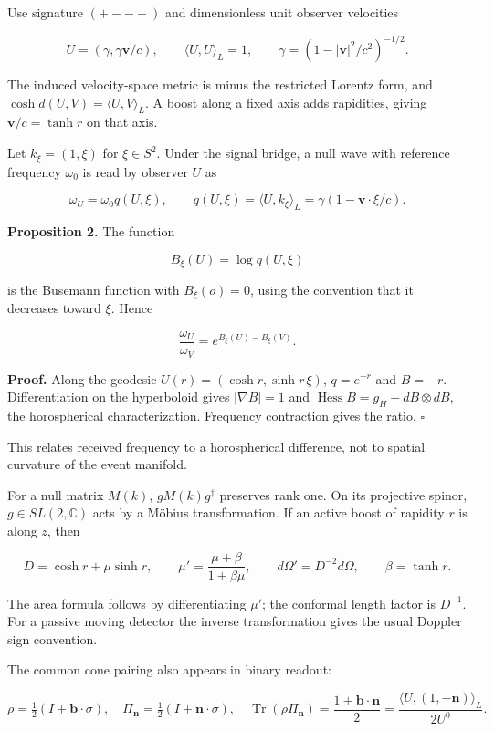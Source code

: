 \documentclass[
  11pt,
  a4paper,
]{article}
\begin{document}
Use signature \((+---)\) and dimensionless unit observer velocities

\[U=(\gamma,\gamma\mathbf v/c),\qquad
\langle U,U\rangle_L=1,\qquad \gamma=(1-|\mathbf v|^2/c^2)^{-1/2}.\]

The induced velocity-space metric is minus the restricted Lorentz form, and \(\cosh d(U,V)=\langle U,V\rangle_L\). A boost along a fixed axis adds rapidities, giving \(\mathbf v/c=\tanh r\) on that axis.

Let \(k_\xi=(1,\xi)\) for \(\xi\in S^2\). Under the signal bridge, a null wave with reference frequency \(\omega_0\) is read by observer \(U\) as

\[\omega_U=\omega_0q(U,\xi),\qquad
q(U,\xi)=\langle U,k_\xi\rangle_L
=\gamma(1-\mathbf v\cdot\xi/c).\]

\textbf{Proposition 2.} The function

\[B_\xi(U)=\log q(U,\xi)\]

is the Busemann function with \(B_\xi(o)=0\), using the convention that it decreases toward \(\xi\). Hence

\[\frac{\omega_U}{\omega_V}
=e^{B_\xi(U)-B_\xi(V)}.\]

\textbf{Proof.} Along the geodesic \(U(r)=(\cosh r,\sinh r\,\xi)\), \(q=e^{-r}\) and \(B=-r\). Differentiation on the hyperboloid gives \(|\nabla B|=1\) and \(\operatorname{Hess}B=g_H-dB\otimes dB\), the horospherical characterization. Frequency contraction gives the ratio. \(\square\)

This relates received frequency to a horospherical difference, not to spatial curvature of the event manifold.

For a null matrix \(M(k)\), \(gM(k)g^\dagger\) preserves rank one. On its projective spinor, \(g\in SL(2,\mathbb C)\) acts by a Möbius transformation. If an active boost of rapidity \(r\) is along \(z\), then

\[D=\cosh r+\mu\sinh r,\qquad
\mu'=\frac{\mu+\beta}{1+\beta\mu},\qquad
d\Omega'=D^{-2}d\Omega,\qquad \beta=\tanh r.\]

The area formula follows by differentiating \(\mu'\); the conformal length factor is \(D^{-1}\). For a passive moving detector the inverse transformation gives the usual Doppler sign convention.

The common cone pairing also appears in binary readout:

\[\rho=\tfrac12(I+\mathbf b\cdot\sigma),\quad
\Pi_{\mathbf n}=\tfrac12(I+\mathbf n\cdot\sigma),\quad
\operatorname{Tr}(\rho\Pi_{\mathbf n})
=\frac{1+\mathbf b\cdot\mathbf n}{2}
=\frac{\langle U,(1,-\mathbf n)\rangle_L}{2U^0}.\]
\end{document}
